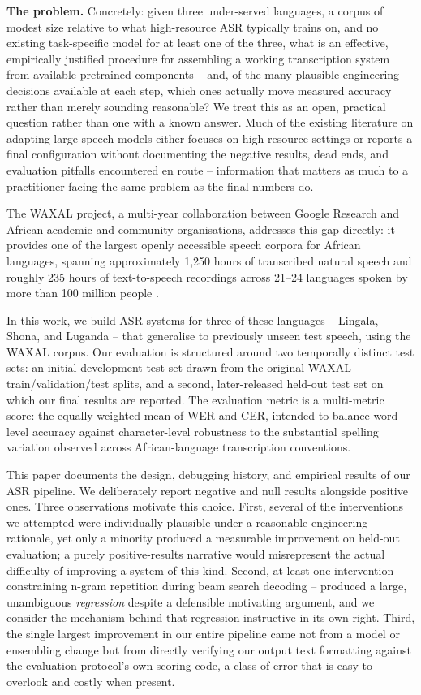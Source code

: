 \documentclass[11pt]{article}
\begin{document}
\textbf{The problem.} Concretely: given three under-served languages, a corpus of modest size relative to what high-resource ASR typically trains on, and no existing task-specific model for at least one of the three, what is an effective, empirically justified procedure for assembling a working transcription system from available pretrained components -- and, of the many plausible engineering decisions available at each step, which ones actually move measured accuracy rather than merely sounding reasonable? We treat this as an open, practical question rather than one with a known answer. Much of the existing literature on adapting large speech models either focuses on high-resource settings or reports a final configuration without documenting the negative results, dead ends, and evaluation pitfalls encountered en route -- information that matters as much to a practitioner facing the same problem as the final numbers do.

The WAXAL project, a multi-year collaboration between Google Research and African academic and community organisations, addresses this gap directly: it provides one of the largest openly accessible speech corpora for African languages, spanning approximately 1{,}250 hours of transcribed natural speech and roughly 235 hours of text-to-speech recordings across 21--24 languages spoken by more than 100 million people \cite{diack2026waxal}.

In this work, we build ASR systems for three of these languages -- Lingala, Shona, and Luganda -- that generalise to previously unseen test speech, using the WAXAL corpus. Our evaluation is structured around two temporally distinct test sets: an initial development test set drawn from the original WAXAL train/validation/test splits, and a second, later-released held-out test set on which our final results are reported. The evaluation metric is a multi-metric score: the equally weighted mean of WER and CER, intended to balance word-level accuracy against character-level robustness to the substantial spelling variation observed across African-language transcription conventions.

This paper documents the design, debugging history, and empirical results of our ASR pipeline. We deliberately report negative and null results alongside positive ones. Three observations motivate this choice. First, several of the interventions we attempted were individually plausible under a reasonable engineering rationale, yet only a minority produced a measurable improvement on held-out evaluation; a purely positive-results narrative would misrepresent the actual difficulty of improving a system of this kind. Second, at least one intervention -- constraining n-gram repetition during beam search decoding -- produced a large, unambiguous \emph{regression} despite a defensible motivating argument, and we consider the mechanism behind that regression instructive in its own right. Third, the single largest improvement in our entire pipeline came not from a model or ensembling change but from directly verifying our output text formatting against the evaluation protocol's own scoring code, a class of error that is easy to overlook and costly when present.
\end{document}
